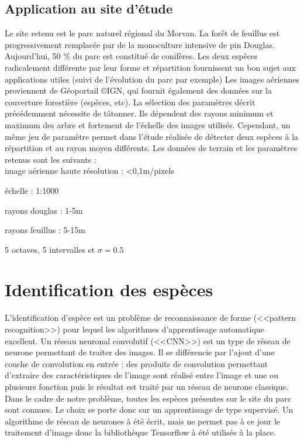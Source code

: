 \documentclass{article}
\begin{document}
	\subsection{Application au site d'étude}
	Le site retenu est le parc naturel régional du Morvan. La forêt de feuillus est progressivement remplacée par de la monoculture intensive de pin Douglas. Aujourd'hui, 50 \% du parc est constitué de conifères. Les deux espèces radicalement différente par leur forme et répartition fournissent un bon sujet aux applications utiles (suivi de l'évolution du parc par exemple) 
	Les images aériennes proviennent de Géoportail \copyright IGN, qui fournit également des données sur la couverture forestière (espèces, etc).
	La sélection des paramètres décrit précédemment nécessite de tâtonner. Ils dépendent des rayons minimum et maximum des arbre et fortement de l'échelle des images utilisés. Cependant, un même jeu de paramètre permet dans l'étude réalisée de détecter deux espèces à la répartition et au rayon moyen différents.  
	Les données de terrain et les paramètres retenus sont les suivants :\\
	
	image aérienne haute résolution : <0,1m/pixels

	échelle : 1:1000
	
	rayons douglas : 1-5m
	
	rayons feuillus : 5-15m

	5 octaves, 5 intervalles et $\sigma=0.5$
	
\section{Identification des espèces}

	L'identification d'espèce est un problème de reconnaissance de forme (<<pattern recognition>>) pour lequel les algorithmes d'apprentissage automatique excellent. Un réseau neuronal convolutif (<<CNN>>) est un type de réseau de neurone permettant de traiter des images. Il se différencie par l'ajout d'une couche de convolution en entrée : des produits de convolution permettant d'extraire des caractéristiques de l'image sont réalisé entre l'image et une ou plusieurs fonction puis le résultat est traité par un réseau de neurone classique. 
	Dans le cadre de notre problème, toutes les espèces présentes sur le site du parc sont connues. Le choix se porte donc sur un apprentissage de type supervisé.
	Un algorithme de réseau de neurones à été écrit, mais ne permet pas à ce jour le traitement d'image donc la bibliothèque Tensorflow à été utilisée à la place.
\end{document}

